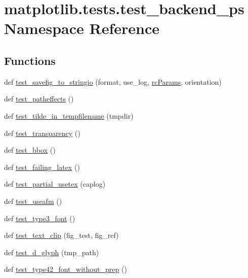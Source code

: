 \hypertarget{namespacematplotlib_1_1tests_1_1test__backend__ps}{}\section{matplotlib.\+tests.\+test\+\_\+backend\+\_\+ps Namespace Reference}
\label{namespacematplotlib_1_1tests_1_1test__backend__ps}
\subsection*{Functions}
\begin{DoxyCompactItemize}
\item 
def \hyperlink{namespacematplotlib_1_1tests_1_1test__backend__ps_a8f1fc99eac48663a5458d771e4a15fe1}{test\+\_\+savefig\+\_\+to\+\_\+stringio} (format, use\+\_\+log, \hyperlink{namespacematplotlib_a685c63e0405a4ac508c17ce26dd0f92e}{rc\+Params}, orientation)
\item 
def \hyperlink{namespacematplotlib_1_1tests_1_1test__backend__ps_a36ad7110184f5603979872302bd21173}{test\+\_\+patheffects} ()
\item 
def \hyperlink{namespacematplotlib_1_1tests_1_1test__backend__ps_a671b7921176f06320dec4dd1d59c43b6}{test\+\_\+tilde\+\_\+in\+\_\+tempfilename} (tmpdir)
\item 
def \hyperlink{namespacematplotlib_1_1tests_1_1test__backend__ps_a2fd6f84aa969021b46a18818b33bfcb2}{test\+\_\+transparency} ()
\item 
def \hyperlink{namespacematplotlib_1_1tests_1_1test__backend__ps_a40e5488fb4432dc211f03eb4fc56e346}{test\+\_\+bbox} ()
\item 
def \hyperlink{namespacematplotlib_1_1tests_1_1test__backend__ps_a3d20dc6a9b2fcdc78a5c1c7998d7dfc1}{test\+\_\+failing\+\_\+latex} ()
\item 
def \hyperlink{namespacematplotlib_1_1tests_1_1test__backend__ps_a5b17882d834fbca0b76c639a44918057}{test\+\_\+partial\+\_\+usetex} (caplog)
\item 
def \hyperlink{namespacematplotlib_1_1tests_1_1test__backend__ps_aa2ac9e024ae343b794eaaafdb99f6f5d}{test\+\_\+useafm} ()
\item 
def \hyperlink{namespacematplotlib_1_1tests_1_1test__backend__ps_aee54964b54d78d28685b28318cf7fbef}{test\+\_\+type3\+\_\+font} ()
\item 
def \hyperlink{namespacematplotlib_1_1tests_1_1test__backend__ps_aa683c46a60683b5df1396f95ece322c9}{test\+\_\+text\+\_\+clip} (fig\+\_\+test, fig\+\_\+ref)
\item 
def \hyperlink{namespacematplotlib_1_1tests_1_1test__backend__ps_ab113bbe70b35f6508728bf6b9fbf4f61}{test\+\_\+d\+\_\+glyph} (tmp\+\_\+path)
\item 
def \hyperlink{namespacematplotlib_1_1tests_1_1test__backend__ps_a721868bb3ef96dae1772f92a5de36fd2}{test\+\_\+type42\+\_\+font\+\_\+without\+\_\+prep} ()
\end{DoxyCompactItemize}
